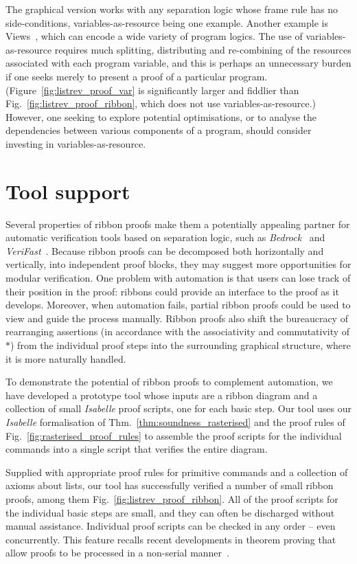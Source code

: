 \documentclass[runningheads,a4paper]{llncs}
\begin{document}
The graphical version works with any separation logic whose frame rule has no side-conditions, variables-as-resource being one example. Another example is Views~\cite{dinsdale-young+13}, which can encode a wide variety of program logics. The use of variables-as-resource requires much splitting, distributing and re-combining of the resources associated with each program variable, and this is perhaps an unnecessary burden if one seeks merely to present a proof of a particular program. (Figure~\ref{fig:listrev_proof_var} is significantly larger and fiddlier than Fig.~\ref{fig:listrev_proof_ribbon}, which does not use variables-as-resource.) However, one seeking to explore potential optimisations, or to analyse the dependencies between various components of a program, should consider investing in variables-as-resource.

\section{Tool support}\label{sect:tool}

Several properties of ribbon proofs make them a potentially appealing partner for automatic verification tools based on separation logic, such as \emph{Bedrock}~\cite{chlipala11} and \emph{VeriFast}~\cite{jacobs+11-b}. Because ribbon proofs can be decomposed both horizontally and vertically, into independent proof blocks, they may suggest more opportunities for modular verification. One problem with automation is that users can lose track of their position in the proof: ribbons could provide an interface to the proof as it develops. Moreover, when automation fails, partial ribbon proofs could be used to view and guide the process manually. Ribbon proofs also shift the bureaucracy of rearranging assertions (in accordance with the associativity and commutativity of $*$) from the individual proof steps into the surrounding graphical structure, where it is more naturally handled.  

To demonstrate the potential of ribbon proofs to complement automation, we have developed a prototype tool whose inputs are a ribbon diagram and a collection of small \emph{Isabelle} proof scripts, one for each basic step. Our tool uses our \emph{Isabelle} formalisation of Thm.~\ref{thm:soundness_rasterised} and the proof rules of Fig.~\ref{fig:rasterised_proof_rules} to assemble the proof scripts for the individual commands into a single script that verifies the entire diagram.

Supplied with appropriate proof rules for primitive commands and a collection of axioms about lists, our tool has successfully verified a number of small ribbon proofs, among them Fig.~\ref{fig:listrev_proof_ribbon}. All of the proof scripts for the individual basic steps are small, and they can often be discharged without manual assistance. Individual proof scripts can be checked in any order -- even concurrently. This feature recalls recent developments in theorem proving that allow proofs to be processed in a non-serial manner~\cite{wenzel12}.
\end{document}
